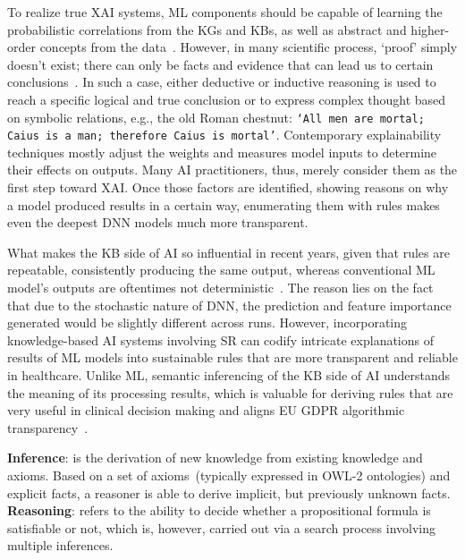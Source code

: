 \hspace*{3.5mm} To realize true XAI systems, ML components should be capable of learning the probabilistic correlations from the KGs and KBs, as well as abstract and higher-order concepts from the data~\cite{SAI}. However, in many scientific process, `proof' simply doesn't exist; there can only be facts and evidence that can lead us to certain conclusions~\cite{SAI,tolstoy2005death}. In such a case, either deductive or inductive reasoning is used to reach a specific logical and true conclusion or to express complex thought based on symbolic relations, e.g., the old Roman chestnut: \texttt{`All men are mortal; Caius is a man; therefore Caius is mortal'}. Contemporary explainability techniques mostly adjust the weights and measures model inputs to determine their effects on outputs. Many AI practitioners, thus, merely consider them as the first step toward XAI. Once those factors are identified, showing reasons on why a model produced results in a certain way, enumerating them with rules makes even the deepest DNN models much more transparent. 

\hspace*{3.5mm} What makes the KB side of AI so influential in recent years, given that rules are repeatable, consistently producing the same output, whereas conventional ML model's outputs are oftentimes not deterministic~\cite{alshahrani2017neuro}. The reason lies on the fact that due to the stochastic nature of DNN, the prediction and feature importance generated would be slightly different across runs. However, incorporating knowledge-based AI systems involving SR can codify intricate explanations of results of ML models into sustainable rules that are more transparent and reliable in healthcare. Unlike ML, semantic inferencing of the KB side of AI understands the meaning of its processing results, which is valuable for deriving rules that are very useful in clinical decision making and aligns EU GDPR algorithmic transparency~\cite{kaminski2019right}. 

\vspace{1mm}
\begin{tcolorbox}[colback=white!3!white,colframe=gray!120!black,title=\faBook~Inference and reasoning]
    \scriptsize{
        \textbf{Inference}: is the derivation of new knowledge from existing knowledge and axioms. Based on a set of axioms~(typically expressed in OWL-2 ontologies) and explicit facts, a reasoner is able to derive implicit, but previously unknown facts. \\
        \textbf{Reasoning}: refers to the ability to decide whether a propositional formula is satisfiable or not, which is, however, carried out via a search process involving multiple inferences.
        }
\end{tcolorbox}
\vspace{-2mm}

